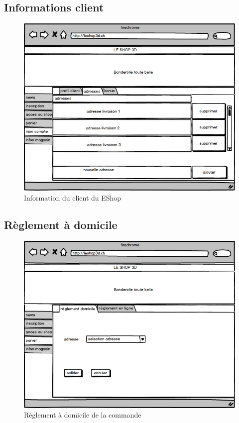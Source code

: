 \documentclass[12pt]{article}
\begin{document}
\newpage
\subsection{Informations client}

\begin{figure}[ht]
    \center
    \includegraphics[scale=0.6]{../Maquettes/compte_client_adresse.jpeg}
    \caption*{Information du client du EShop}
\end{figure}

\newpage
\subsection{Règlement à domicile}

\begin{figure}[ht]
    \center
    \includegraphics[scale=0.6]{../Maquettes/reglement_domicile.jpeg}
    \caption*{Règlement à domicile de la commande}
\end{figure}
\end{document}
